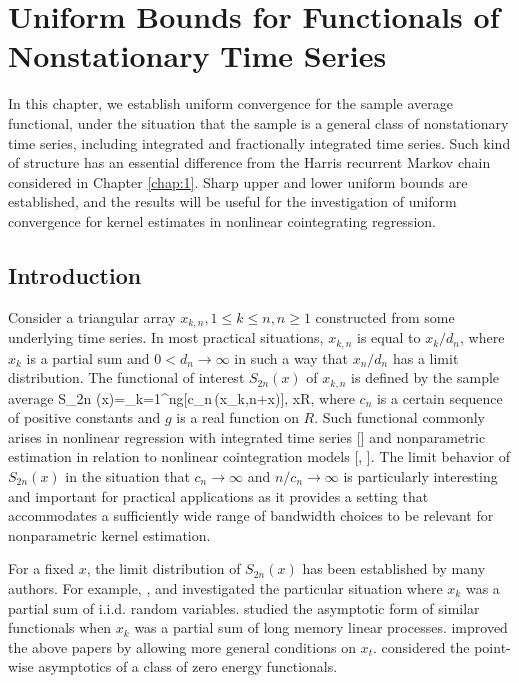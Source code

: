 
\chapter{Uniform Bounds for Functionals of Nonstationary Time Series} 
\ifpdf
    \graphicspath{{Chapter2/Chapter2Figs/PNG/}{Chapter2/Chapter2Figs/PDF/}{Chapter2/Chapter2Figs/}}
\else
    \graphicspath{{Chapter2/Chapter2Figs/EPS/}{Chapter2/Chapter2Figs/}}
\fi

In this chapter, we establish uniform convergence for the sample average functional, under the situation that the sample is a general class of nonstationary time series, including integrated and fractionally integrated time series. Such kind of structure has an essential difference from the Harris recurrent Markov chain considered in Chapter \ref{chap:1}. Sharp upper and lower uniform bounds are established, and the results will be useful for the investigation of uniform convergence for kernel estimates in nonlinear cointegrating regression.

\section{Introduction}
Consider a triangular array ${x_{k,n},1\leq k\leq n,n\geq
1}$ constructed from some underlying time series.
In most practical situations, $x_{k,n}$ is equal to $x_k/d_n$, where $x_k$
is a partial sum and $0 < d_n\to \infty$ in such a way that $x_n/d_n$ has a limit distribution.  The functional of interest $ S_{2n}(x)$ of $x_{k,n}$ is defined by the sample average
\bestar
S_{2n} (x)=\sum_{k=1}^{n}g[c_{n}\,(x_{k,n}+x)], \quad x\in R,
\eestar
where $c_{n}$ is a certain sequence of positive constants and $g$ is
a real function on $R$. Such functional commonly arises in nonlinear regression with integrated time series [\citet[][\citeyear{parkphillips2001}]{parkphillips1999}] and nonparametric estimation in relation to nonlinear cointegration models [\cite{phillipspark1998}, \cite{karlsentjostheim2001}]. The limit behavior of $S_{2n}(x)$ in the situation that $c_{n}\rightarrow \infty $ and $n/c_{n}\rightarrow \infty $ is particularly interesting and important for practical applications as it provides a setting that accommodates a sufficiently wide range of bandwidth choices to be relevant for nonparametric kernel estimation.

For a fixed $x$, the limit distribution of $S_{2n}(x)$ has been established by many authors. For example, \cite{borodinibragimov1995}, \cite{akonom1993} and \cite{phillipspark1998} investigated the particular situation where $x_{k}$ was a partial sum of i.i.d. random variables. \cite{jeganathan2004} studied the asymptotic form of similar functionals when $x_{k}$ was a partial sum of long memory linear processes. \cite{wangphillips2010a} improved the above papers by allowing more general conditions on $x_t$.  \cite{wangphillips2010b} considered the point-wise asymptotics of a class of zero energy functionals.  

